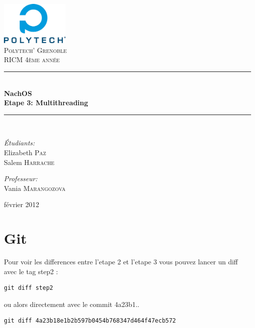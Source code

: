 \documentclass[a4paper,10pt]{article}
\newcommand{\HRule}{\rule{\linewidth}{0.5mm}}
\begin{document}
\begin{titlepage}

\begin{center}


\includegraphics[width=0.25\textwidth]{./images/logo}\\[1cm]

\textsc{\LARGE Polytech' Grenoble}\\[1.5cm]

\textsc{\Large RICM 4\`eme ann\'ee}\\[1.2cm]


\HRule \\[0.4cm]
{ \huge \bfseries NachOS\\[0.6cm]
Etape 3: Multithreading}
\\[0.4cm]

\HRule \\[2cm]

\begin{minipage}{0.4\textwidth}
\begin{flushleft} \large
\emph{\'Etudiants:}\\
Elizabeth \textsc{Paz} \\
Salem \textsc{Harrache}
\end{flushleft}
\end{minipage}
\begin{minipage}{0.4\textwidth}
\begin{flushright} \large
\emph{Professeur:} \\
Vania \textsc{Marangozova}
\end{flushright}
\end{minipage}

\vfill

{\large  février 2012}

\end{center}

\end{titlepage}

\section{Git}

Pour voir les differences entre l'etape 2 et l'etape 3 vous pouvez lancer un
diff avec le tag step2 :
\begin{lstlisting}
git diff step2
\end{lstlisting}
ou alors directement avec le commit 4a23b1..
\begin{lstlisting}
git diff 4a23b18e1b2b597b0454b768347d464f47ecb572
\end{lstlisting}
\end{document}
